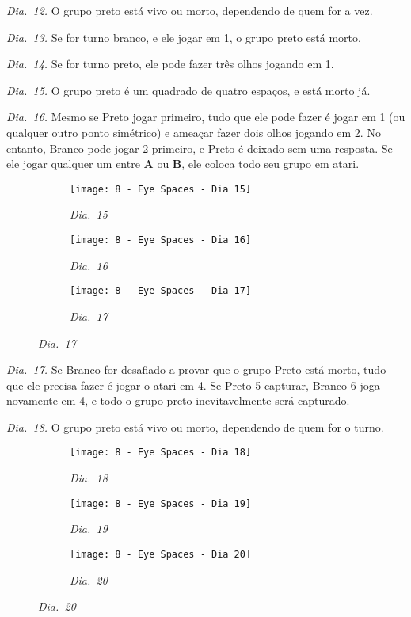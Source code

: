\emph{Dia.\@~12.} O grupo preto está vivo ou morto, dependendo de quem for a vez.

\emph{Dia.\@~13.} Se for turno branco, e ele jogar em 1, o grupo preto está morto.

\emph{Dia.\@~14.} Se for turno preto, ele pode fazer três olhos jogando em 1.

\pagebreak

\emph{Dia.\@~15.} O grupo preto é um quadrado de quatro espaços, e está morto já.

\emph{Dia.\@~16.} Mesmo se Preto jogar primeiro, tudo que ele pode fazer é jogar em 1 (ou qualquer outro ponto simétrico) e ameaçar fazer dois olhos jogando em 2. No entanto, Branco pode jogar 2 primeiro, e Preto é deixado sem uma resposta. Se ele jogar qualquer um entre \textbf{A} ou \textbf{B}, ele coloca todo seu grupo em atari.

\begin{figure}[h!]
    \centering
    \begin{subfigure}[t]{.31\textwidth}
        \texttt{[image: 8 - Eye Spaces - Dia 15]}
        \caption*{\emph{Dia.\@~15}}
    \end{subfigure}
    \hfill
    \begin{subfigure}[t]{.31\textwidth}
        \texttt{[image: 8 - Eye Spaces - Dia 16]}
        \caption*{\emph{Dia.\@~16}}
    \end{subfigure}
    \hfill
    \begin{subfigure}[t]{.31\textwidth}
        \texttt{[image: 8 - Eye Spaces - Dia 17]}
        \caption*{\emph{Dia.\@~17}}
    \end{subfigure}
\end{figure}

\emph{Dia.\@~17.} Se Branco for desafiado a provar que o grupo Preto está morto, tudo que ele precisa fazer é jogar o atari em 4. Se Preto 5 capturar, Branco 6 joga novamente em 4, e todo o grupo preto inevitavelmente será capturado.

\emph{Dia.\@~18.} O grupo preto está vivo ou morto, dependendo de quem for o turno.

\begin{figure}[h!]
    \centering
    \begin{subfigure}[t]{.31\textwidth}
        \texttt{[image: 8 - Eye Spaces - Dia 18]}
        \caption*{\emph{Dia.\@~18}}
    \end{subfigure}
    \hfill
    \begin{subfigure}[t]{.31\textwidth}
        \texttt{[image: 8 - Eye Spaces - Dia 19]}
        \caption*{\emph{Dia.\@~19}}
    \end{subfigure}
    \hfill
    \begin{subfigure}[t]{.31\textwidth}
        \texttt{[image: 8 - Eye Spaces - Dia 20]}
        \caption*{\emph{Dia.\@~20}}
    \end{subfigure}
\end{figure}

